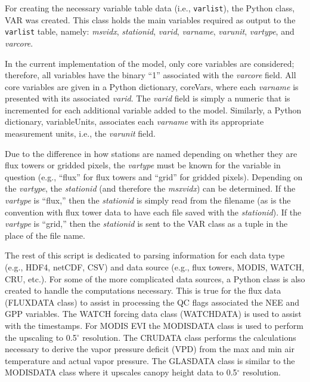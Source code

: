For creating the necessary variable table data (i.e., \texttt{var\textunderscore list}), the Python class, VAR was created.  
This class holds the main variables required as output to the \texttt{var\textunderscore list} table, namely: \textit{msvidx}, \textit{stationid}, \textit{varid}, \textit{varname}, \textit{varunit}, \textit{vartype}, and \textit{varcore}.  

In the current implementation of the model, only core variables are considered; therefore, all variables have the binary ``1'' associated with the \textit{varcore} field.  
All core variables are given in a Python dictionary, coreVars, where each \textit{varname} is presented with its associated \textit{varid}.  
The \textit{varid} field is simply a numeric that is incremented for each additional variable added to the model.  
Similarly, a Python dictionary, variableUnits, associates each \textit{varname} with its appropriate measurement units, i.e., the \textit{varunit} field.  

Due to the difference in how stations are named depending on whether they are flux towers or gridded pixels, the \textit{vartype} must be known for the variable in question (e.g., ``flux'' for flux towers and ``grid'' for gridded pixels).  
Depending on the \textit{vartype}, the \textit{stationid} (and therefore the \textit{msxvidx}) can be determined.  If the \textit{vartype} is ``flux,'' then the \textit{stationid} is simply read from the filename (as is the convention with flux tower data to have each file saved with the \textit{stationid}).  
If the \textit{vartype} is ``grid,'' then the \textit{stationid} is sent to the VAR class as a tuple in the place of the file name.

The rest of this script is dedicated to parsing information for each data type (e.g., HDF4, netCDF, CSV) and data source (e.g., flux towers, MODIS, WATCH, CRU, etc.).  
For some of the more complicated data sources, a Python class is also created to handle the computations necessary.  
This is true for the flux data (FLUXDATA class) to assist in processing the QC flags associated the NEE and GPP variables.  
The WATCH forcing data class (WATCHDATA) is used to assist with the timestamps.  
For MODIS EVI the MODISDATA class is used to perform the upscaling to 0.5$^{\circ}$ resolution.  
The CRUDATA class performs the calculations necessary to derive the vapor pressure deficit (VPD) from the max and min air temperature and actual vapor pressure.  
The GLASDATA class is similar to the MODISDATA class where it upscales canopy height data to 0.5$^{\circ}$ resolution.  

